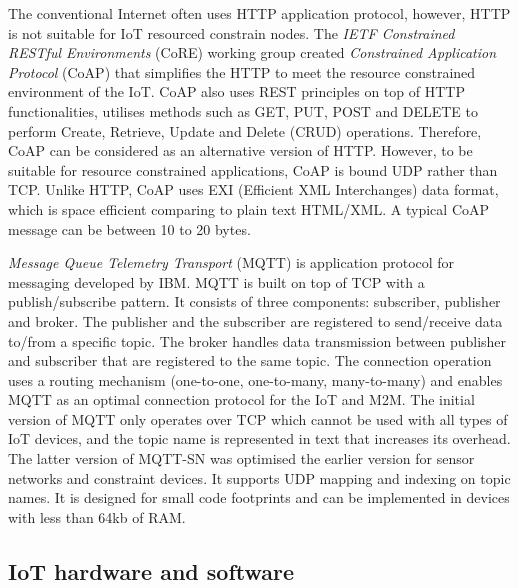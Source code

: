 The conventional Internet often uses HTTP application protocol, however, HTTP is not suitable for IoT resourced constrain nodes.
The \textit{IETF Constrained RESTful Environments} (CoRE) working group created \textit{Constrained Application Protocol} (CoAP) that simplifies the HTTP to meet the resource constrained environment of the IoT. 
CoAP also uses REST principles on top of HTTP functionalities, utilises methods such as GET, PUT, POST and DELETE to perform Create, Retrieve, Update and Delete (CRUD) operations.
Therefore, CoAP can be considered as an alternative version of HTTP.
However, to be suitable for resource constrained applications, CoAP is bound UDP rather than TCP.
Unlike HTTP, CoAP uses  EXI (Efficient XML Interchanges) data format, which is space efficient comparing to plain text HTML/XML.
A typical CoAP message can be between 10 to 20 bytes.

\textit{Message Queue Telemetry Transport} (MQTT) is application protocol for messaging developed by IBM.
MQTT is built on top of TCP with a publish/subscribe pattern.
It consists of three components: subscriber, publisher and broker.
The publisher and the subscriber are registered to send/receive data to/from a specific topic.
The broker handles data transmission between publisher and subscriber that are registered to the same topic.
The connection operation uses a routing
mechanism (one-to-one, one-to-many, many-to-many) and enables
MQTT as an optimal connection protocol for the IoT
and M2M.
The initial version of MQTT only operates over TCP which cannot be used with all types of IoT devices, and the topic name 
is represented in text that increases its overhead.
The latter version of MQTT-SN was optimised the earlier version for sensor networks and constraint devices.
It supports UDP mapping and indexing on topic names. 
It is designed for small code footprints and can be implemented in devices with less than 64kb of RAM.

\subsection{IoT hardware and software}

